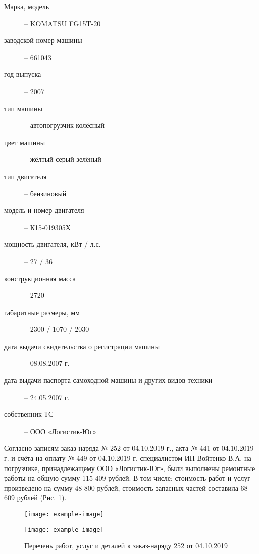 \begin{description}
%		
	\item[Марка, модель] -- KOMATSU FG15T-20
    \item[заводской номер машины] -- 661043
	\item[год выпуска ] -- 2007
	\item[тип машины] -- автопогрузчик колёсный
	\item[цвет машины] --  жёлтый-серый-зелёный
    \item[тип двигателя] -- бензиновый
    \item[модель и номер двигателя] -- К15-019305Х
    \item[мощность двигателя, кВт / л.с.] -- 27 / 36
    \item[конструкционная масса] -- 2720
    \item[габаритные размеры, мм] --  2300 / 1070 / 2030
    \item[дата выдачи свидетельства о регистрации машины] -- 08.08.2007 г.
    \item[дата выдачи паспорта самоходной машины и других видов техники] -- 24.05.2007 г.
    \item[собственник ТС ] -- ООО «Логистик-Юг» 
    \end{description}
\vspace{2mm}


\vspace{3mm}
\par Согласно  записям  заказ-наряда № 252 от 04.10.2019 г.,  акта № 441 от 04.10.2019 г. и счёта на оплату № 449 от 04.10.2019 г.  специалистом ИП Войтенко В.А. на погрузчике, принадлежащему ООО «Логистик-Юг», были выполнены ремонтные работы  на общую сумму 115 409 рублей. В том числе: стоимость работ и услуг произведено на сумму 48 800 рублей, стоимость запасных частей составила 68 609 рублей (Рис. \ref{переченьдеталей}).    

\vspace{7mm}
\begin{figure}[H]
    \centering
    \texttt{[image: example-image]}
\end{figure}
\begin{figure}[H]
    \centering
    \texttt{[image: example-image]}
        \caption{Перечень работ, услуг и деталей к заказ-наряду 252 от 04.10.2019}
       {\footnotesize\label{переченьдеталей}}
\end{figure}

